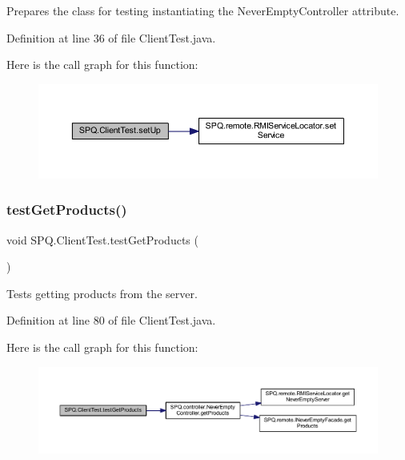 Prepares the class for testing instantiating the Never\+Empty\+Controller attribute. 

Definition at line 36 of file Client\+Test.\+java.

Here is the call graph for this function\+:\nopagebreak
\begin{figure}[H]
\begin{center}
\leavevmode
\includegraphics[width=350pt]{class_s_p_q_1_1_client_test_abcdab9dbc12c8a65ebbfb96877e4d5a1_cgraph}
\end{center}
\end{figure}
\mbox{\label{class_s_p_q_1_1_client_test_ab83877066a3bb92e514ca496cb96cdbf}} 
\subsubsection{\texorpdfstring{test\+Get\+Products()}{testGetProducts()}}
{\footnotesize\ttfamily void S\+P\+Q.\+Client\+Test.\+test\+Get\+Products (\begin{DoxyParamCaption}{ }\end{DoxyParamCaption})}

Tests getting products from the server. 

Definition at line 80 of file Client\+Test.\+java.

Here is the call graph for this function\+:\nopagebreak
\begin{figure}[H]
\begin{center}
\leavevmode
\includegraphics[width=350pt]{class_s_p_q_1_1_client_test_ab83877066a3bb92e514ca496cb96cdbf_cgraph}
\end{center}
\end{figure}
\mbox{\label{class_s_p_q_1_1_client_test_a611b894c9d3826db1d2104e2aae23267}} 
